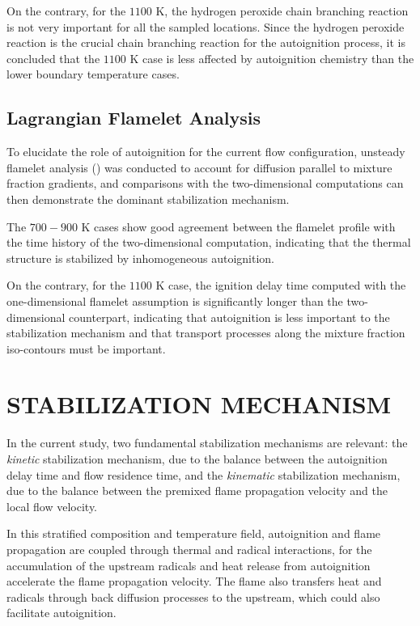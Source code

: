 \documentclass[twocolumn,10pt]{hphrc}
\begin{document}
On the contrary, for the $1100$ K, the hydrogen peroxide chain branching reaction is not very important for all the sampled locations.  Since the hydrogen peroxide reaction is the crucial chain branching reaction for the autoignition process, it is concluded that the $1100$ K case is less affected by autoignition chemistry than the lower boundary temperature cases.  

\subsection*{Lagrangian Flamelet Analysis}

To elucidate the role of autoignition for the current flow configuration, unsteady flamelet analysis (\cite{pitsch98a}) was conducted to account for diffusion parallel to mixture fraction gradients, and comparisons with the two-dimensional computations can then demonstrate the dominant stabilization mechanism.

The $700-900$ K cases show good agreement between the flamelet profile with the time history of the two-dimensional computation, indicating that the thermal structure is stabilized by inhomogeneous autoignition.  

On the contrary, for the $1100$ K case, the ignition delay time computed with the one-dimensional flamelet assumption is significantly longer than the two-dimensional counterpart, indicating that autoignition is less important to the stabilization mechanism and that transport processes along the mixture fraction iso-contours must be important.

\section*{STABILIZATION MECHANISM}

In the current study, two fundamental stabilization mechanisms are relevant: the \emph {kinetic} stabilization mechanism, due to the balance between the autoignition delay time and flow residence time, and the \emph {kinematic} stabilization mechanism, due to the balance between the premixed flame propagation velocity and the local flow velocity. 

In this stratified composition and temperature field, autoignition and flame propagation are coupled through thermal and radical interactions, for the accumulation of the upstream radicals and heat release from autoignition accelerate the flame propagation velocity.  The flame also transfers heat and radicals through back diffusion processes to the upstream, which could also facilitate autoignition.
\end{document}
